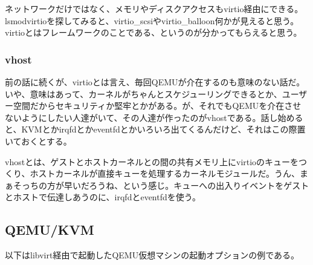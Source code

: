 \documentclass[9pt,b5paper,tombo]{jsbook}
\begin{document}
ネットワークだけではなく、メモリやディスクアクセスもvirtio経由にできる。lsmodvirtioを探してみると、virtio\_scsiやvirtio\_balloon何かが見えると思う。virtioとはフレームワークのことである、というのが分かってもらえると思う。

\subsubsection{vhost}

前の話に続くが、virtioとは言え、毎回QEMUが介在するのも意味のない話だ。いや、意味はあって、カーネルがちゃんとスケジューリングできるとか、ユーザー空間だからセキュリティか堅牢とかがある。が、それでもQEMUを介在させないようにしたい人達がいて、その人達が作ったのがvhostである。話し始めると、KVMとかirqfdとかeventfdとかいろいろ出てくるんだけど、それはこの際置いておくとする。

vhostとは、ゲストとホストカーネルとの間の共有メモリ上にvirtioのキューをつくり、ホストカーネルが直接キューを処理するカーネルモジュールだ。うん、まぁそっちの方が早いだろうね、という感じ。キューへの出入りイベントをゲストとホストで伝達しあうのに、irqfdとeventfdを使う。

\subsection{QEMU/KVM}

以下はlibvirt経由で起動したQEMU仮想マシンの起動オプションの例である。
\end{document}
